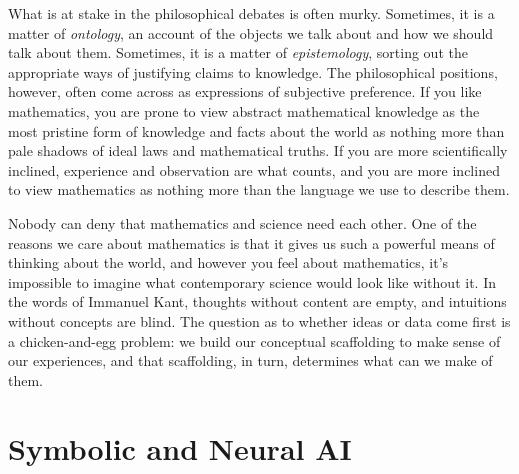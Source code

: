 \documentclass[11pt]{article}
\begin{document}
What is at stake in the philosophical debates is often murky. Sometimes, it is a matter of \emph{ontology}, an account of the objects we talk about and how we should talk about them. Sometimes, it is a matter of \emph{epistemology}, sorting out the appropriate ways of justifying claims to knowledge. The philosophical positions, however, often come across as expressions of subjective preference. If you like mathematics, you are prone to view abstract mathematical knowledge as the most pristine form of knowledge and facts about the world as nothing more than pale shadows of ideal laws and mathematical truths. If you are more scientifically inclined, experience and observation are what counts, and you are more inclined to view mathematics as nothing more than the language we use to describe them.

Nobody can deny that mathematics and science need each other. One of the reasons we care about mathematics is that it gives us such a powerful means of thinking about the world, and however you feel about mathematics, it's impossible to imagine what contemporary science would look like without it. In the words of Immanuel Kant, thoughts without content are empty, and intuitions without concepts are blind. The question as to whether ideas or data come first is a chicken-and-egg problem: we build our conceptual scaffolding to make sense of our experiences, and that scaffolding, in turn, determines what can we make of them.

\section{Symbolic and Neural AI}
\end{document}
